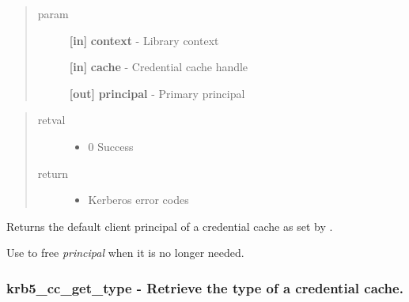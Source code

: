 \documentclass[letterpaper,10pt,english]{sphinxmanual}
\begin{document}
\begin{quote}\begin{description}
\item[{param}] \leavevmode
\textbf{{[}in{]}} \textbf{context} - Library context

\textbf{{[}in{]}} \textbf{cache} - Credential cache handle

\textbf{{[}out{]}} \textbf{principal} - Primary principal

\end{description}\end{quote}
\begin{quote}\begin{description}
\item[{retval}] \leavevmode\begin{itemize}
\item {} 
0   Success

\end{itemize}

\item[{return}] \leavevmode\begin{itemize}
\item {} 
Kerberos error codes

\end{itemize}

\end{description}\end{quote}

Returns the default client principal of a credential cache as set by {\hyperref[appdev/refs/api/krb5_cc_initialize:krb5_cc_initialize]{}} .

Use {\hyperref[appdev/refs/api/krb5_free_principal:krb5_free_principal]{}} to free \emph{principal} when it is no longer needed.


\subsubsection{krb5\_cc\_get\_type -  Retrieve the type of a credential cache.}
\label{appdev/refs/api/krb5_cc_get_type:krb5-cc-get-type-retrieve-the-type-of-a-credential-cache}\label{appdev/refs/api/krb5_cc_get_type::doc}

\begin{fulllineitems}
\label{appdev/refs/api/krb5_cc_get_type:krb5_cc_get_type}
\end{fulllineitems}
\end{document}

